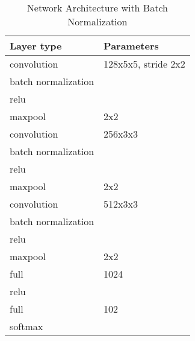 \documentclass[a4paper, 11pt]{article}
\begin{document}
\begin{table}[!h]
	\begin{center}
		\begin{tabularx}{.5\linewidth}{|X|l|}
			\hline \textbf{Layer type} & \textbf{Parameters} \\ 
			\hline convolution & 128x5x5, stride 2x2 \\ 
			\hline batch normalization & \\
			\hline relu &\\
			\hline maxpool &  2x2\\ 
			\hline convolution & 256x3x3 \\ 
			\hline batch normalization & \\
			\hline relu &\\
			\hline maxpool &  2x2\\ 
			\hline convolution & 512x3x3 \\ 
			\hline batch normalization & \\
			\hline relu &\\
			\hline maxpool &  2x2\\ 
			\hline full &  1024 \\ 
			\hline relu &\\
			\hline full &  102 \\
			\hline softmax & \\
			\hline
		\end{tabularx}
	\end{center}
	\caption{Network Architecture with Batch Normalization}
	\label{tab:bn-arch}
\end{table}
\end{document}
